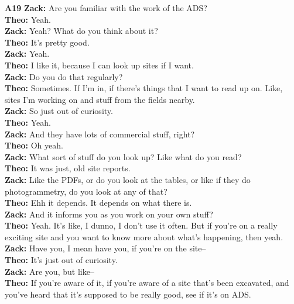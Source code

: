 \documentclass{article}
\begin{document}
\noindent\textbf{A19}\label{sec-A19}\newline
\textbf{Zack:} Are you familiar with the work of the ADS?\\
\textbf{Theo:} Yeah.\\
\textbf{Zack:} Yeah? What do you think about it?\\
\textbf{Theo:} It's pretty good.\\
\textbf{Zack:} Yeah.\\
\textbf{Theo:} I like it, because I can look up sites if I want.\\
\textbf{Zack:} Do you do that regularly?\\
\textbf{Theo:} Sometimes. If I'm in, if there's things that I want to
read up on. Like, sites I'm working on and stuff from the fields
nearby.\\
\textbf{Zack:} So just out of curiosity.\\
\textbf{Theo:} Yeah.\\
\textbf{Zack:} And they have lots of commercial stuff, right?\\
\textbf{Theo:} Oh yeah.\\
\textbf{Zack:} What sort of stuff do you look up? Like what do you
read?\\
\textbf{Theo:} It was just, old site reports.\\
\textbf{Zack:} Like the PDFs, or do you look at the tables, or like if
they do photogrammetry, do you look at any of that?\\
\textbf{Theo:} Ehh it depends. It depends on what there is.\\
\textbf{Zack:} And it informs you as you work on your own stuff?\\
\textbf{Theo:} Yeah. It's like, I dunno, I don't use it often. But if
you're on a really exciting site and you want to know more about what's
happening, then yeah.\\
\textbf{Zack:} Have you, I mean have you, if you're on the site--\\
\textbf{Theo:} It's just out of curiosity.\\
\textbf{Zack:} Are you, but like--\\
\textbf{Theo:} If you're aware of it, if you're aware of a site that's
been excavated, and you've heard that it's supposed to be really good,
see if it's on ADS.\newline
\end{document}
